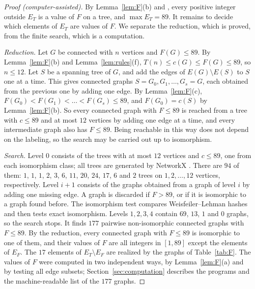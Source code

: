 \documentclass[11pt]{amsart}
\theoremstyle{definition}
\theoremstyle{remark}
\newcommand{\Tr}[1]{T(#1)}
\begin{document}
\begin{proof}[Proof \textup{(computer-assisted)}]
By Lemma~\ref{lem:F}(b) and \cite{CSW}, every positive integer outside $E_T$ is a value of $F$ on a tree, and $\max E_T=89$. It remains to decide which elements of $E_T$ are values of $F$. We separate the reduction, which is proved, from the finite search, which is a computation.

\emph{Reduction.} Let $G$ be connected with $n$ vertices and $F(G)\le89$. By Lemma~\ref{lem:F}(b) and Lemma~\ref{lem:rules}(f), $\Tr{n}\le c(G)\le F(G)\le89$, so $n\le12$. Let $S$ be a spanning tree of $G$, and add the edges of $E(G)\setminus E(S)$ to $S$ one at a time. This gives connected graphs $S=G_0,G_1,\dots,G_s=G$, each obtained from the previous one by adding one edge. By Lemma~\ref{lem:F}(c), $F(G_0)<F(G_1)<\dots<F(G_s)\le89$, and $F(G_0)=c(S)$ by Lemma~\ref{lem:F}(b). So every connected graph with $F\le89$ is reached from a tree with $c\le89$ and at most $12$ vertices by adding one edge at a time, and every intermediate graph also has $F\le89$. Being reachable in this way does not depend on the labeling, so the search may be carried out up to isomorphism.

\emph{Search.} Level $0$ consists of the trees with at most $12$ vertices and $c\le89$, one from each isomorphism class; all trees are generated by NetworkX \cite{NX}. There are $94$ of them: $1$, $1$, $1$, $2$, $3$, $6$, $11$, $20$, $24$, $17$, $6$ and $2$ trees on $1,2,\dots,12$ vertices, respectively. Level $i+1$ consists of the graphs obtained from a graph of level $i$ by adding one missing edge. A graph is discarded if $F>89$, or if it is isomorphic to a graph found before. The isomorphism test compares Weisfeiler--Lehman hashes and then tests exact isomorphism. Levels $1,2,3,4$ contain $69$, $13$, $1$ and $0$ graphs, so the search stops. It finds $177$ pairwise non-isomorphic connected graphs with $F\le89$. By the reduction, every connected graph with $F\le89$ is isomorphic to one of them, and their values of $F$ are all integers in $[1,89]$ except the elements of $E_F$. The $17$ elements of $E_T\setminus E_F$ are realized by the graphs of Table~\ref{tab:F}. The values of $F$ were computed in two independent ways, by Lemma~\ref{lem:F}(a) and by testing all edge subsets; Section~\ref{sec:computation} describes the programs and the machine-readable list of the $177$ graphs.
\end{proof}
\end{document}
